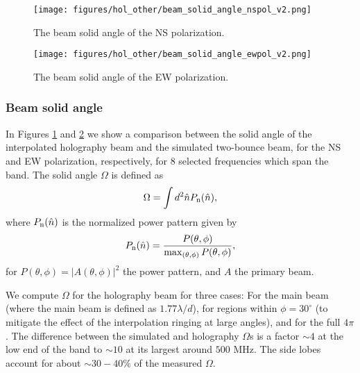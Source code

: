 
\begin{figure}[h!]
\begin{center}
\texttt{[image: figures/hol\_other/beam\_solid\_angle\_nspol\_v2.png]}
\caption{The beam solid angle of the NS polarization. \label{bsans}}
\end{center}
\end{figure}

\begin{figure}[h!]
\begin{center}
\texttt{[image: figures/hol\_other/beam\_solid\_angle\_ewpol\_v2.png]}
\caption{The beam solid angle of the EW polarization. \label{bsaew}}
\end{center}
\end{figure}

\subsubsection{Beam solid angle}

In Figures \ref{bsans} and \ref{bsaew} we show a comparison between the solid angle of the interpolated holography beam and the simulated two-bounce beam, for the NS and EW polarization, respectively, for 8 selected frequencies which span the band. The solid angle $\Omega$ is defined as
\begin{equation}
\Omega = \int d^2 \hat{n} P_{\rm n}(\hat{n}), \label{Omega}
\end{equation}
where $P_{\rm n}(\hat{n})$ is the normalized power pattern given by
\begin{equation}
P_{\rm n}(\hat{n}) = \frac{P(\theta, \phi)}{\max_{(\theta, \phi)} {P(\theta, \phi)}},
\end{equation}
for $P(\theta, \phi) = |A(\theta, \phi)|^2$ the power pattern, and $A$ the primary beam.

We compute $\Omega$ for the holography beam for three cases: For the main beam (where the main beam is defined as $1.77\lambda/d$),  for regions within $\phi = 30^\circ$ (to mitigate the effect of the interpolation ringing at large angles), and for the full $4\pi$. The difference between the simulated and holography $\Omega$s is a factor $\sim 4$ at the low end of the band to $\sim 10$ at its largest around $500$ MHz.  The side lobes account for about $\sim 30-40\%$ of the measured $\Omega$.

